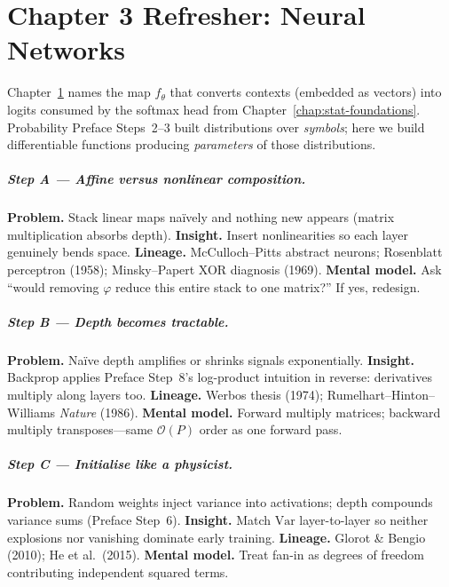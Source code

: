 \chapter{Chapter 3 Refresher: Neural Networks}
\label{chap:neural-networks}
\label{sec:math-refresher-neural-networks}

\scenelabel
Chapter~\ref{chap:neural-networks} names the map \(f_\theta\) that converts contexts (embedded as vectors) into logits consumed by the softmax head from Chapter~\ref{chap:stat-foundations}. Probability Preface Steps~2--3 built distributions over \emph{symbols}; here we build differentiable functions producing \emph{parameters} of those distributions.

\paragraph{Step A --- Affine versus nonlinear composition.}
\textbf{Problem.} Stack linear maps naïvely and nothing new appears (matrix multiplication absorbs depth).
\textbf{Insight.} Insert nonlinearities so each layer genuinely bends space.
\textbf{Lineage.} McCulloch--Pitts abstract neurons; Rosenblatt perceptron (1958); Minsky--Papert XOR diagnosis (1969).
\textbf{Mental model.} Ask ``would removing \(\varphi\) reduce this entire stack to one matrix?'' If yes, redesign.

\paragraph{Step B --- Depth becomes tractable.}
\textbf{Problem.} Naïve depth amplifies or shrinks signals exponentially.
\textbf{Insight.} Backprop applies Preface Step~8's log-product intuition in reverse: derivatives multiply along layers too.
\textbf{Lineage.} Werbos thesis (1974); Rumelhart--Hinton--Williams \emph{Nature} (1986).
\textbf{Mental model.} Forward multiply matrices; backward multiply transposes---same \(\mathcal{O}(P)\) order as one forward pass.

\paragraph{Step C --- Initialise like a physicist.}
\textbf{Problem.} Random weights inject variance into activations; depth compounds variance sums (Preface Step~6).
\textbf{Insight.} Match \(\mathrm{Var}\) layer-to-layer so neither explosions nor vanishing dominate early training.
\textbf{Lineage.} Glorot \& Bengio (2010); He et al.\ (2015).
\textbf{Mental model.} Treat fan-in as degrees of freedom contributing independent squared terms.

